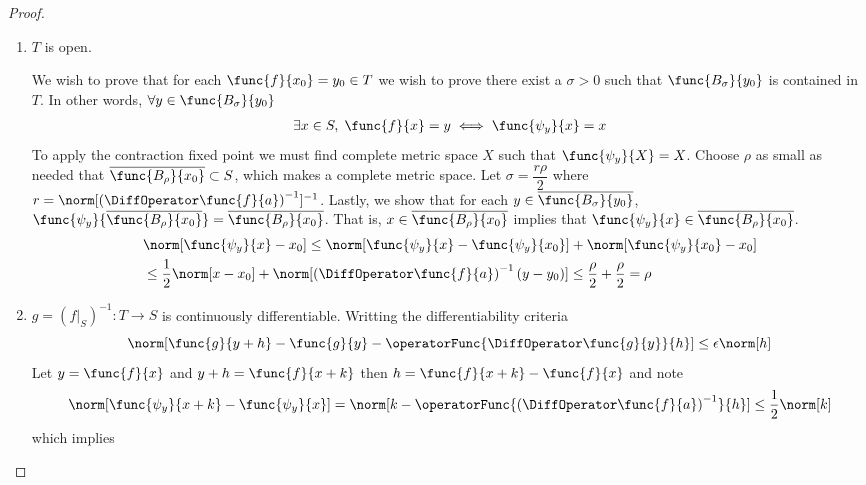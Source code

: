 \begin{proof}
\begin{enumerate}
        \item  \(T\) is open.

              We wish to prove that for each \(\func{f}{x_0} = y_0 \in T\) we wish to prove there exist a \( \sigma > 0\) such that \(\func{B_\sigma}{y_0}\) is contained in \(T\). In other words, \(\forall y \in \func{B_\sigma}{y_0}\)
              \begin{align*}
                  \exists x \in S, \; \func{f}{x} = y \iff \func{\psi_y}{x} = x
              \end{align*}
              To apply the contraction fixed point we must find complete metric space \(X\) such that \(\func{\psi_y}{X} = X\). Choose \(\rho\) as small as needed that \(\overline{\func{B_\rho}{x_0}} \subset S\), which makes a complete metric space. Let \(\sigma =  \dfrac{r \rho}{2}\) where \(r = \norm[\left(\DiffOperator \func{f}{a}\right)^{-1}]^{-1}\). Lastly, we show that for each \(y \in \overline{\func{B_\sigma}{y_0}}\), \(\func{\psi_y}{ \overline{\func{B_\rho}{x_0}} }=  \overline{\func{B_\rho}{x_0}}\). That is, \(x \in \overline{\func{B_\rho}{x_0}}\) implies that \( \func{\psi_y}{x} \in \overline{\func{B_\rho}{x_0}}\).
              \begin{align*}
                   & \norm[\func{\psi_y}{x}  - x_0] \leq \norm[\func{\psi_y}{x} - \func{\psi_y}{x_0}] + \norm[\func{\psi_y}{x_0} - x_0]                              \\
                   & \leq  \dfrac{1}{2} \norm[x - x_0] +  \norm[\left(\DiffOperator \func{f}{a}\right)^{-1}(y - y_0)]  \leq \dfrac{\rho}{2} + \dfrac{\rho}{2} = \rho
              \end{align*}
        \item \(g = (f|_S)^{-1} : T \to S\) is continuously differentiable. Writting the differentiability criteria
              \begin{equation*}
                  \norm[\func{g}{y + h} - \func{g}{y} - \operatorFunc{\DiffOperator \func{g}{y}}{h}] \leq \epsilon \norm[h]
              \end{equation*}
              Let \(y = \func{f}{x}\) and \(y + h = \func{f}{x + k}\) then \(h = \func{f}{x + k} - \func{f}{x}\) and note
              \begin{equation*}
                  \norm[\func{\psi_y}{x + k} - \func{\psi_y}{x}] = \norm[k - \operatorFunc{\left(\DiffOperator \func{f}{a}\right)^{-1}}{h}] \leq \dfrac{1}{2} \norm[k]
              \end{equation*}
              which implies
              \begin{equation*}

\end{equation*}
\end{enumerate}
\end{proof}
